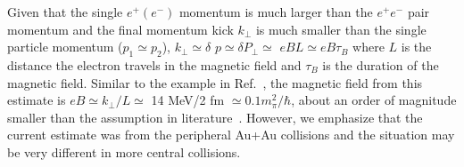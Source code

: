 \documentclass[12pt,epjc3]{svjour3}\sloppy
\begin{document}
Given that the single $e^+(e^-)$ momentum is much larger than the $e^+e^-$ pair momentum and the final momentum kick $k_{\perp}$ is much smaller than the single particle momentum ($p_1\simeq p_2$), $k_{\perp} \simeq \delta$ $p\simeq\delta P_{\perp}\simeq$ $e B L \simeq e B \tau_B$ where $L$ is the distance the electron travels in the magnetic field and $\tau_B$ is the duration of the magnetic field. 
Similar to the example in Ref.~\cite{TuchinPhysRevC.82.034904}, the magnetic field from this estimate is $e B \simeq k_{\perp}/L\simeq$ 14 MeV/2 fm $\simeq0.1m_{\pi}^2/\hbar$, about an order of magnitude smaller than the assumption in literature~\cite{TuchinPhysRevC.82.034904}. 
However, we emphasize that the current estimate was from the peripheral Au+Au collisions and the situation may be very different in more central collisions. 

\end{document}
